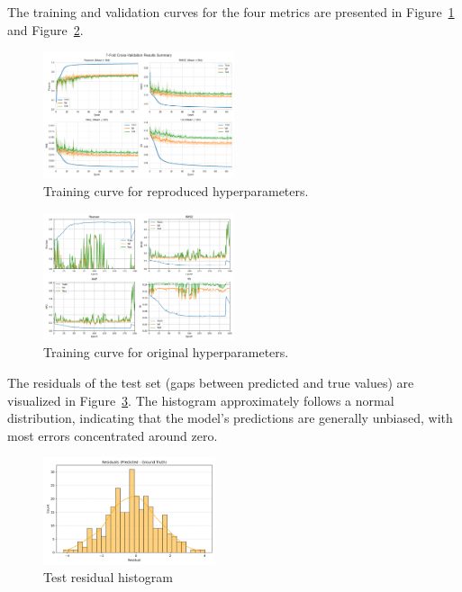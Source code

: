 \documentclass[unnumsec,webpdf,contemporary,large]{oup-authoring-template}
\theoremstyle{thmstyleone}%
\theoremstyle{thmstyletwo}%
\theoremstyle{thmstylethree}%
\begin{document}
The training and validation curves for the four metrics are presented in Figure~\ref{fig:ReproducedtrainPlot} and Figure~\ref{fig:OriginaltrainPlot}.
\begin{figure}[H]
    \centering
    \includegraphics[width=0.5\textwidth]{images/7fold_result.png}
    \caption{Training curve for reproduced hyperparameters.}
    \label{fig:ReproducedtrainPlot}
\end{figure}
\begin{figure}[H]
    \centering
    \includegraphics[width=0.5\textwidth]{images/origin_param.png}
    \caption{Training curve for original hyperparameters.}
    \label{fig:OriginaltrainPlot}
\end{figure}
The residuals of the test set (gaps between predicted and true values) are visualized in Figure~\ref{fig:test residuals}. 
The histogram approximately follows a normal distribution, 
indicating that the model's predictions are generally unbiased, with most errors concentrated around zero. 

\begin{figure}[H]
    \centering
    \includegraphics[width=0.45\textwidth]{images/reproduction_residuals_seaborn.png}
    \caption{Test residual histogram}
    \label{fig:test residuals}
\end{figure}
\end{document}
